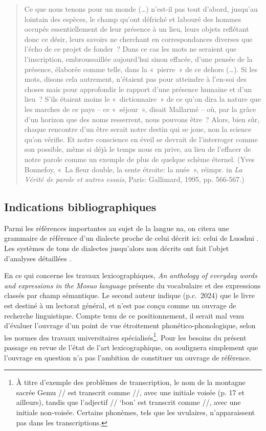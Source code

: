 	\begin{quote}
    Ce que nous tenons pour un monde (…) n’est-il pas tout d’abord, jusqu’au lointain des espèces, le champ qu’ont défriché et labouré des hommes occupés essentiellement de leur présence à un lieu, leurs objets reflétant donc ce désir, leurs savoirs ne cherchant en correspondances diverses que l’écho de ce projet de fonder ? Dans ce cas les mots ne seraient que l’inscription, embroussaillée aujourd'hui sinon effacée, d’une pensée de la présence, élaborée comme telle, dans la « pierre » de ce dehors (…). Si les mots, disons cela autrement, n’étaient pas pour atteindre à l’en-soi des choses mais pour approfondir le rapport d’une présence humaine et d'un lieu ? S’ils étaient moins le « dictionnaire » de ce qu’on dira la nature que les marches de ce pays – ce « séjour », disait Mallarmé – où, par la grâce d'un horizon que des noms resserrent, nous pouvons être ? Alors, bien sûr, chaque rencontre d'un être serait notre destin qui se joue, non la science qu’on vérifie. Et notre conscience en éveil se devrait de l’interroger comme son possible, même si déjà le temps nous en prive, au lieu de l’effacer de notre parole comme un exemple de plus de quelque schème éternel. (Yves Bonnefoy, « La fleur double, la sente étroite: la nuée », réimpr. in \emph{La Vérité de parole et autres essais}, Paris: Gallimard, 1995, pp. 566-567.)
\end{quote}

\subsection*{Indications bibliographiques}

Parmi les références importantes au sujet de la langue na, on citera une grammaire de référence d'un dialecte proche de celui décrit ici: celui de Luoshui  \parencite{lidz2010}. Les systèmes de tons de dialectes jusqu'alors non décrits ont fait l'objet d'analyses détaillées \parencite{a2016,dobbsetal2016,michaud2017,fily_documentation_2022}.

En ce qui concerne les travaux lexicographiques, \emph{An anthology of everyday words and expressions in the Mosuo language} \parencite{zhibaetal2013} présente du vocabulaire et des expressions classés par champ sémantique. Le second auteur indique (p.c.\ 2024) que le livre est destiné à un lectorat général, et n'est pas conçu comme un ouvrage de recherche linguistique. Compte tenu de ce positionnement, il serait mal venu d'évaluer l'ouvrage d'un point de vue étroitement phonético-phonologique, selon les normes des travaux universitaires spécialisés\footnote{À titre d'exemple des problèmes de transcription, le nom de la montagne sacrée Gemu // est transcrit comme //, avec une initiale voisée (p. 17 et ailleurs), tandis que l'adjectif // `bon' est transcrit comme //, avec une initiale non-voisée. Certains phonèmes, tels que les uvulaires, n'apparaissent pas dans les transcriptions.}. Pour les besoins du présent passage en revue de l'état de l'art lexicographique, on soulignera simplement que l'ouvrage en question n'a pas l'ambition de constituer un ouvrage de référence.

